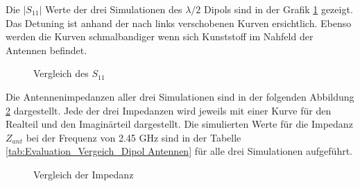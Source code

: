 Die $|S_{11}|$ Werte der drei Simulationen des $\lambda/2$ Dipols sind in der Grafik \ref{S11_Vergleich_Simulation} gezeigt. Das Detuning ist anhand der nach links verschobenen Kurven ersichtlich. Ebenso werden die Kurven schmalbandiger wenn sich Kunststoff im Nahfeld der Antennen befindet.

\begin{figure}[!ht]
	\centering
	\begingroup
	
	\endgroup
	\caption{Vergleich des $S_{11}$}
	\label{S11_Vergleich_Simulation}
\end{figure}
\newpage
Die Antennenimpedanzen aller drei Simulationen sind in der folgenden Abbildung \ref{Impedanz_Vergleich_Simulation} dargestellt. Jede der drei Impedanzen wird jeweils mit einer Kurve für den Realteil und den Imaginärteil dargestellt. Die simulierten Werte für die Impedanz $Z_{ant}$ bei der Frequenz von 2.45 GHz sind in der Tabelle \ref{tab:Evaluation_Vergeich_Dipol Antennen} für alle drei Simulationen aufgeführt.
\begin{figure}[!ht]
	\centering
	\begingroup
	
	\endgroup
	\caption{Vergleich der Impedanz}
	\label{Impedanz_Vergleich_Simulation}
\end{figure}
\clearpage
\newpage
